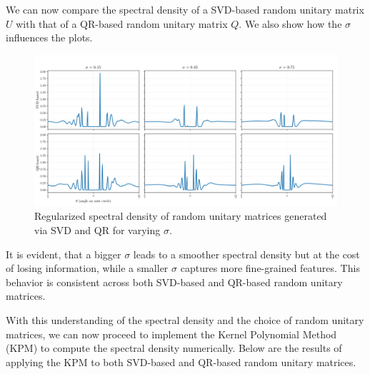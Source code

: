 We can now compare the spectral density of a SVD-based random unitary matrix $U$ with that of a QR-based random unitary matrix $Q$. We also show how the $\sigma$ influences the plots.

\begin{figure}[H]
    \centering
    \includegraphics[width=1\textwidth]{Graphics/compare_svd_qr_spectral_density.png}
    \caption{Regularized spectral density of random unitary matrices generated via SVD and QR for varying $\sigma$.}
    \label{fig:spectral_density_comparison}
\end{figure}

It is evident, that a bigger $\sigma$ leads to a smoother spectral density but at the cost of losing information, while a smaller $\sigma$ captures more fine-grained features. This behavior is consistent across both SVD-based and QR-based random unitary matrices.

With this understanding of the spectral density and the choice of random unitary matrices, we can now proceed to implement the Kernel Polynomial Method (KPM) to compute the spectral density numerically. Below are the results of applying the KPM to both SVD-based and QR-based random unitary matrices.

